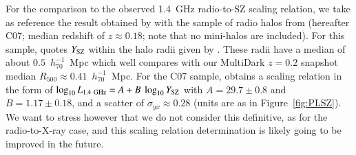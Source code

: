 \documentclass[traditabstract]{aa}
\newcommand{\rmn}{\mathrm}
\begin{document}
For the comparison to the observed 1.4~GHz radio-to-SZ scaling relation, we take as reference the result obtained by \cite{2012MNRAS.421L.112B} with the sample of radio halos from \cite{2007MNRAS.378.1565C} (hereafter C07; median redshift of $z \approx 0.18$; note that no mini-halos are included). For this sample, \cite{2012MNRAS.421L.112B} quotes $Y_{\rm{SZ}}$ within the halo radii given by \cite{2007MNRAS.378.1565C}. These radii have a median of about $0.5$~$h_{70}^{-1}$~Mpc which well compares with our MultiDark $z = 0.2$ snapshot median $R_{500} \approx 0.41$~$h_{70}^{-1}$~Mpc. For the C07 sample, \cite{2012MNRAS.421L.112B} obtains a scaling relation in the form of  $\log_{10} L_{1.4~\rmn{GHz}} = A + B~\log_{10} Y_{\rm{SZ}}$ with $A=29.7\pm0.8$ and $B=1.17\pm0.18$, and a scatter of $\sigma_{yx} \approx 0.28$ (units are as in Figure~\ref{fig:PLSZ}). We want to stress however that we do not consider this definitive, as for the radio-to-X-ray case, and this scaling relation determination is likely going to be improved in the future. 
\end{document}
